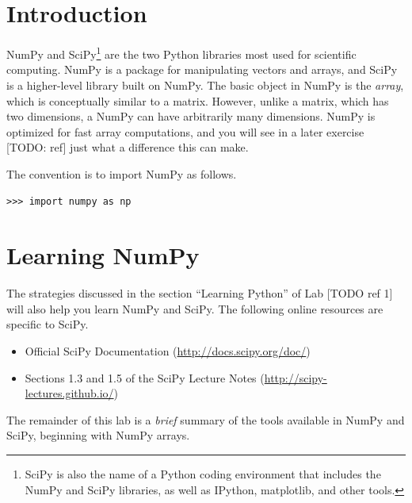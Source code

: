 \label{lab:NumPyArrays}

\section*{Introduction}

NumPy and SciPy\footnote{SciPy is also the name of a Python coding environment that includes the NumPy and SciPy libraries, as well as IPython, matplotlib, and other tools.} are the two Python libraries most used for scientific computing. NumPy is a package for manipulating vectors and arrays, and SciPy is a higher-level library built on NumPy. The basic object in NumPy is the \emph{array}, which is conceptually similar to a matrix. However, unlike a matrix, which has two dimensions, a NumPy  can have arbitrarily many dimensions. NumPy is optimized for fast array computations, and you will see in a later exercise [TODO: ref] just what a difference this can make.

The convention is to import NumPy as follows.

\begin{lstlisting}
>>> import numpy as np
\end{lstlisting}

\section*{Learning NumPy}
The strategies discussed in the section ``Learning Python'' of Lab [TODO ref 1] will also help you learn NumPy and SciPy. The following online resources are specific to SciPy.
\begin{itemize}
\item Official SciPy Documentation (\url{http://docs.scipy.org/doc/})
\item Sections 1.3 and 1.5 of the SciPy Lecture Notes (\url{http://scipy-lectures.github.io/})
\end{itemize}
The remainder of this lab is a \emph{brief} summary of the tools available in NumPy and SciPy, beginning with NumPy arrays.


